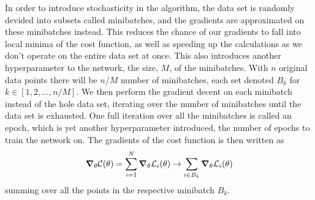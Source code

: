 \documentclass[10pt, twocolumn]{article}
\begin{document}
In order to introduce stochasticity in the algorithm, the data set is randomly devided into subsets called minibatches, and the gradients are approximated on these minibatches instead. This reduces the chance of our gradients to fall into local minima of the cost function, as well as speeding up the calculations as we don't operate on the entire data set at once. This also introduces another hyperparameter to the network, the size, $M$, of the minibatches. With $n$ original data points there will be $n/M$ number of minibatches, each set denoted $B_k$ for $k \in \left[1,2,\ldots,n/M\right]$. We then perform the gradient decent on each minibatch instead of the hole data set, iterating over the number of minibatches until the data set is exhausted. One full iteration over all the minibatches is called an epoch, which is yet another hyperparameter introduced, the number of epochs to train the network on. The gradients of the cost function is then written as
\begin{equation}
    \grad_\theta \mathcal{C}(\theta) = \sum_{i=1}^{N} \grad_\theta \mathcal{L}_i(\theta) \rightarrow \sum_{i\in B_k} \grad_\theta \mathcal{L}_i(\theta)
\end{equation}
summing over all the points in the respective minibatch $B_k$.
\end{document}
